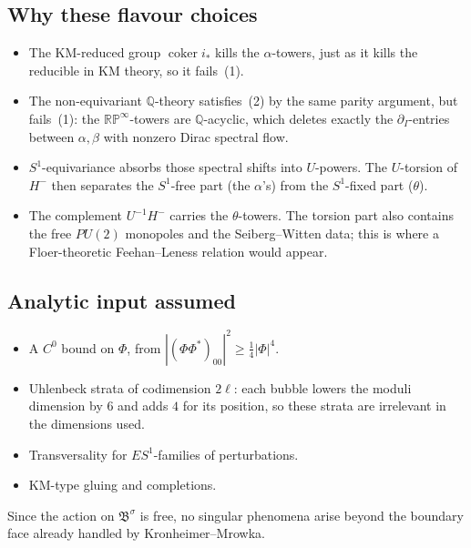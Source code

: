 \documentclass[11pt]{amsart}
\theoremstyle{definition}
\theoremstyle{remark}
\newcommand{\Q}{\mathbb{Q}}
\newcommand{\RP}{\mathbb{RP}}
\newcommand{\B}{\mathfrak{B}}
\DeclareMathOperator{\coker}{coker}
\begin{document}
\subsection*{Why these flavour choices}
\begin{itemize}[leftmargin=*]
\item The KM-reduced group $\coker i_*$ kills the $\alpha$-towers, just as
  it kills the reducible in KM theory, so it fails~(1).
\item The non-equivariant $\Q$-theory satisfies~(2) by the same parity
  argument, but fails~(1): the $\RP^\infty$-towers are $\Q$-acyclic, which
  deletes exactly the $\partial_I$-entries between $\alpha,\beta$ with
  nonzero Dirac spectral flow.
\item $S^1$-equivariance absorbs those spectral shifts into $U$-powers.
  The $U$-torsion of $H^-$ then separates the $S^1$-free part (the
  $\alpha$'s) from the $S^1$-fixed part ($\theta$).
\item The complement $U^{-1}H^-$ carries the $\theta$-towers. The torsion
  part also contains the free $PU(2)$ monopoles and the Seiberg--Witten
  data; this is where a Floer-theoretic Feehan--Leness relation would
  appear.
\end{itemize}

\subsection*{Analytic input assumed}
\begin{itemize}[leftmargin=*]
\item A $C^0$ bound on $\Phi$, from
  $|(\Phi\Phi^*)_{00}|^2\ge\tfrac14|\Phi|^4$.
\item Uhlenbeck strata of codimension $2\ell$: each bubble lowers the
  moduli dimension by $6$ and adds $4$ for its position, so these strata
  are irrelevant in the dimensions used.
\item Transversality for $ES^1$-families of perturbations.
\item KM-type gluing and completions.
\end{itemize}
Since the action on $\B^\sigma$ is free, no singular phenomena arise
beyond the boundary face already handled by Kronheimer--Mrowka.
\end{document}
